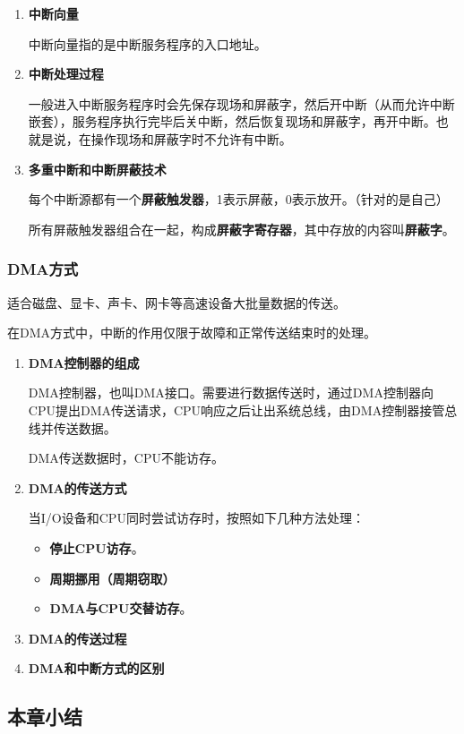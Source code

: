 \documentclass[12pt, a4paper, oneside]{ctexart}
\begin{document}
\begin{enumerate}
  \item {\bf 中断向量}
  
  中断向量指的是中断服务程序的入口地址。

  \item {\bf 中断处理过程}
  
  一般进入中断服务程序时会先保存现场和屏蔽字，然后开中断（从而允许中断嵌套），服务程序执行完毕后关中断，然后恢复现场和屏蔽字，再开中断。也就是说，在操作现场和屏蔽字时不允许有中断。

  \item {\bf 多重中断和中断屏蔽技术}
  
  每个中断源都有一个\textbf{屏蔽触发器}，1表示屏蔽，0表示放开。（针对的是自己）

  所有屏蔽触发器组合在一起，构成\textbf{屏蔽字寄存器}，其中存放的内容叫\textbf{屏蔽字}。
\end{enumerate}

\subsubsection{DMA方式}

适合磁盘、显卡、声卡、网卡等高速设备大批量数据的传送。

在DMA方式中，中断的作用仅限于故障和正常传送结束时的处理。

\begin{enumerate}
  \item {\bf DMA控制器的组成}
  
  DMA控制器，也叫DMA接口。需要进行数据传送时，通过DMA控制器向CPU提出DMA传送请求，CPU响应之后让出系统总线，由DMA控制器接管总线并传送数据。

  DMA传送数据时，CPU不能访存。

  \item {\bf DMA的传送方式}
  
  当I/O设备和CPU同时尝试访存时，按照如下几种方法处理：
  \begin{itemize}
    \item {\bf 停止CPU访存}。
    \item {\bf 周期挪用（周期窃取）}
    \item {\bf DMA与CPU交替访存}。
  \end{itemize}
  \item {\bf DMA的传送过程}
  \item {\bf DMA和中断方式的区别}
\end{enumerate}

\subsection{本章小结}
\end{document}

